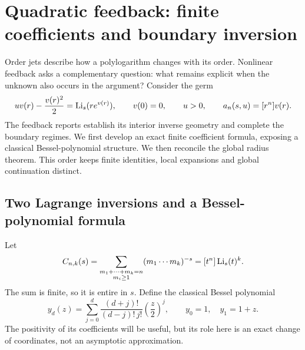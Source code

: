 \section{Quadratic feedback: finite coefficients and boundary inversion}
\label{qfb:section}

Order jets describe how a polylogarithm changes with its order. Nonlinear
feedback asks a complementary question: what remains explicit when the
unknown also occurs in the argument? Consider the germ
\begin{equation}\label{qfb:model}
 uv(r)-\frac{v(r)^2}{2}=\operatorname{Li}_s(re^{v(r)}),\qquad v(0)=0,\qquad u>0,
 \qquad a_n(s,u)=[r^n]v(r).
\end{equation}
The feedback reports \cite{qfb:reports} establish its interior inverse
geometry and complete the boundary regimes. We first develop an exact
finite coefficient formula, exposing a classical Bessel-polynomial
structure. We then reconcile the global radius theorem. This order keeps
finite identities, local expansions and global continuation distinct.

\subsection{Two Lagrange inversions and a Bessel-polynomial formula}
Let
\[
 C_{n,k}(s)=
 \sum_{\substack{m_1+\cdots+m_k=n\\m_i\ge1}}(m_1\cdots m_k)^{-s}
 =[t^n]\operatorname{Li}_s(t)^k .
\]
The sum is finite, so it is entire in $s$. Define the classical Bessel
polynomial \cite{qfb:bessel}
\[
 y_d(z)=\sum_{j=0}^d\frac{(d+j)!}{(d-j)!\,j!}\left(\frac z2\right)^j,
 \qquad y_0=1,\quad y_1=1+z.
\]
The positivity of its coefficients will be useful, but its role here is
an exact change of coordinates, not an asymptotic approximation.

